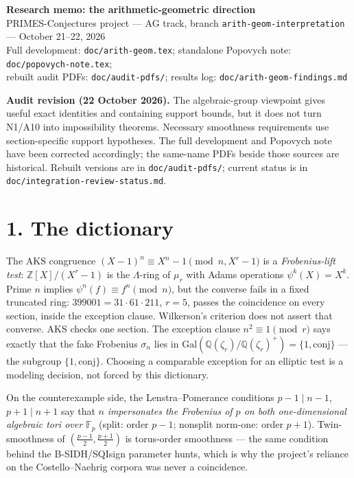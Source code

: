 \documentclass[10pt]{article}
\newcommand{\Z}{\mathbb{Z}}
\newcommand{\F}{\mathbb{F}}
\newcommand{\Q}{\mathbb{Q}}
\begin{document}
\begin{center}
{\LARGE\bfseries Research memo: the arithmetic-geometric direction}\\[3pt]
{\small PRIMES-Conjectures project --- AG track, branch
\texttt{arith-geom-interpretation} --- October 21--22, 2026\\
Full development: \texttt{doc/arith-geom.tex};
standalone Popovych note: \texttt{doc/popovych-note.tex};\\
rebuilt audit PDFs: \texttt{doc/audit-pdfs/};
results log: \texttt{doc/arith-geom-findings.md}}
\end{center}

\textbf{Audit revision (22 October 2026).}
The algebraic-group viewpoint gives useful exact identities and containing
support bounds, but it does not turn N1/A10 into impossibility theorems.
Necessary smoothness requirements use section-specific support hypotheses.
The full development and Popovych note have been corrected accordingly;
the same-name PDFs beside those sources are historical. Rebuilt versions are
in \texttt{doc/audit-pdfs/}; current status is in
\texttt{doc/integration-review-status.md}.

\section*{1. The dictionary}

The AKS congruence $(X-1)^n \equiv X^n - 1 \pmod{n, X^r-1}$ is a
\emph{Frobenius-lift test}: $\Z[X]/(X^r{-}1)$ is the $\Lambda$-ring of
$\mu_r$ with Adams operations $\psi^k(X)=X^k$. Prime $n$ implies
$\psi^n(f)\equiv f^n\pmod n$, but the converse fails in a fixed truncated
ring: $399001=31\cdot61\cdot211$, $r=5$, passes the coincidence on every
section, inside the exception clause. Wilkerson's criterion does not assert
that converse. AKS checks one section. The exception clause
$n^2 \equiv 1 \pmod r$ says exactly that the fake Frobenius $\sigma_n$ lies
in $\mathrm{Gal}(\Q(\zeta_r)/\Q(\zeta_r)^+) = \{1, \text{conj}\}$ --- the
subgroup $\{1,\text{conj}\}$. Choosing a comparable exception for an elliptic
test is a modeling decision, not forced by this dictionary.

On the counterexample side, the Lenstra--Pomerance conditions
$p - 1 \mid n - 1$, $p + 1 \mid n + 1$ say that $n$ \emph{impersonates the
Frobenius of $p$ on both one-dimensional algebraic tori over $\F_p$} (split:
order $p-1$; nonsplit norm-one: order $p+1$). Twin-smoothness of
$(\frac{p-1}{2}, \frac{p+1}{2})$ is torus-order smoothness --- the same
condition behind the B-SIDH/SQIsign parameter hunts, which is why the
project's reliance on the Costello--Naehrig corpora was never a coincidence.
\end{document}
